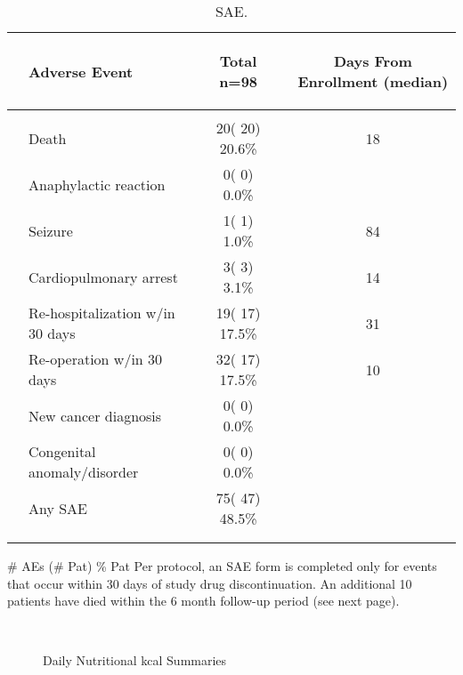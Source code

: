 \documentclass[dvips,10pt]{article}
\begin{document}
\begin{table}[t]
\caption
{ SAE. }
\begin{center}
\begin{tabular}{ @{}l@{}
@{}l@{}@{}p{1.5em}@{}@{}c@{}@{}p{1.5em}@{}@{}c@{}
}
\hline

& \parbox{6em}{\begin{center}Adverse Event\end{center}} && \parbox{6em}{\begin{center}Total n=98\end{center}} && \parbox{6em}{\begin{center}Days From Enrollment  (median)\end{center}} \\

\hline

\\
& Death && 20( 20) 20.6\% && 18 \\
& Anaphylactic reaction && 0(  0)  0.0\% &&  \\
& Seizure && 1(  1)  1.0\% && 84 \\
& Cardiopulmonary arrest && 3(  3)  3.1\% && 14 \\
& Re-hospitalization w/in 30 days && 19( 17) 17.5\% && 31 \\
& Re-operation w/in 30 days && 32( 17) 17.5\% && 10 \\
& New cancer diagnosis && 0(  0)  0.0\% &&  \\
& Congenital anomaly/disorder && 0(  0)  0.0\% &&  \\
& Any SAE && 75( 47) 48.5\% &&  \\
\\
\hline \\

\end{tabular}


\parbox{ 5in }{ \# AEs (\# Pat) \% Pat \newline Per protocol, an SAE form is completed only for events that occur within 30
  days of study drug discontinuation.  An additional 10 patients have died within
  the 6 month follow-up period (see next page). } \\
 \vspace{1em}\end{center}
 \end{table}
\clearpage

\begin{figure}
\caption{Daily Nutritional kcal Summaries}
\end{figure}
\clearpage
\end{document}
